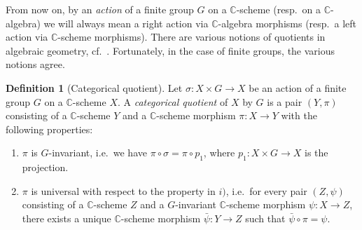 \documentclass[12pt,a4paper]{amsart}
\theoremstyle{plain}
\theoremstyle{definition}
\newtheorem{defn}[thm]{Definition}
\theoremstyle{remark}
\begin{document}
From now on, by an \textit{action} of a finite group $G$ on a $\mathbb{C}$-scheme (resp.~on a $\mathbb{C}$-algebra) we will always mean a right action via $\mathbb{C}$-algebra morphisms (resp.~a left action via $\mathbb{C}$-scheme morphisms).
There are various notions of quotients in algebraic geometry, cf.~\cite[\S 0.1]{mfk94}.
Fortunately, in the case of finite groups, the various notions agree.

\begin{defn}[Categorical quotient]
  Let $\sigma \colon X \times G \to X$ be an action of a finite group $G$ on a $\mathbb{C}$-scheme $X$.
  A \textit{categorical quotient} of $X$ by $G$ is a pair $(Y,\pi)$ consisting of a $\mathbb{C}$-scheme $Y$ and a $\mathbb{C}$-scheme morphism $\pi \colon X \to Y$ with the following properties:
  \begin{enumerate}[label=\roman*)]
    \item $\pi$ is $G$-invariant, i.e.~we have $\pi \circ \sigma = \pi \circ p_{1}$, where $p_{1} \colon X \times G \to X$ is the projection.
    \item $\pi$ is universal with respect to the property in $i)$, i.e.~for every pair $(Z,\psi)$ consisting of a $\mathbb{C}$-scheme $Z$ and a $G$-invariant $\mathbb{C}$-scheme morphism $\psi \colon X \to Z$, there exists a unique $\mathbb{C}$-scheme morphism $\bar{\psi} \colon Y \to Z$ such that $\bar{\psi} \circ \pi = \psi$.
  \end{enumerate}
\end{defn}
\end{document}
